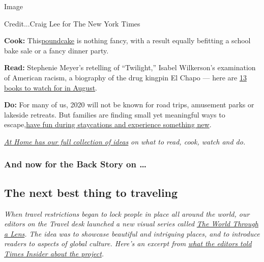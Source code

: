 Image

Credit...Craig Lee for The New York Times

\textbf{Cook:}
This\href{https://cooking.nytimes3xbfgragh.onion/recipes/12194-field-day-poundcake}{poundcake}
is nothing fancy, with a result equally befitting a school bake sale or
a fancy dinner party.

\textbf{Read:} Stephenie Meyer's retelling of ``Twilight,'' Isabel
Wilkerson's examination of American racism, a biography of the drug
kingpin El Chapo --- here are
\href{https://www.nytimes3xbfgragh.onion/2020/07/30/books/new-august-books.html?action=click\&module=RelatedLinks\&pgtype=collection}{13
books to watch for in August}.

\textbf{Do:} For many of us, 2020 will not be known for road trips,
amusement parks or lakeside retreats. But families are finding small yet
meaningful ways to
escape,\href{https://www.nytimes3xbfgragh.onion/2020/07/24/parenting/summer-staycation-coronavirus.html?action=click\&module=RelatedLinks\&pgtype=collection}{have
fun during staycations and experience something new}.

\href{https://www.nytimes3xbfgragh.onion/spotlight/at-home}{\emph{At
Home has our full collection of ideas}} \emph{on what to read, cook,
watch and do.}

\hypertarget{and-now-for-the-back-story-on-}{%
\subsubsection{And now for the Back Story on
\ldots{}}\label{and-now-for-the-back-story-on-}}

\hypertarget{the-next-best-thing-to-traveling}{%
\subsection{The next best thing to
traveling}\label{the-next-best-thing-to-traveling}}

\emph{When travel restrictions began to lock people in place all around
the world, our editors on the Travel desk launched a new visual series
called}
\href{https://www.nytimes3xbfgragh.onion/column/the-world-through-a-lens}{\emph{The
World Through a Lens}}\emph{. The idea was to showcase beautiful and
intriguing places, and to introduce readers to aspects of global
culture. Here's an excerpt from}
\href{https://www.nytimes3xbfgragh.onion/2020/08/03/insider/letting-their-cameras-transport-you.html}{\emph{what
the editors told Times Insider about the project}}\emph{.}

